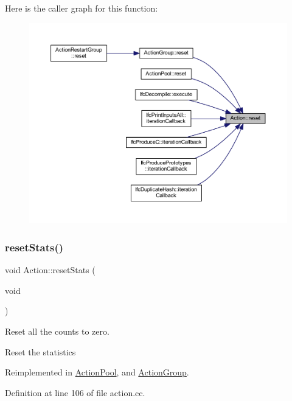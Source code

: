 Here is the caller graph for this function\+:
\nopagebreak
\begin{figure}[H]
\begin{center}
\leavevmode
\includegraphics[width=350pt]{class_action_ac7c1cf16bb63e0741ba16be5179cf943_icgraph}
\end{center}
\end{figure}
\mbox{\label{class_action_a8ac616ae7f497202746a92c95e32821d}} 
\subsubsection{\texorpdfstring{resetStats()}{resetStats()}}
{\footnotesize\ttfamily void Action\+::reset\+Stats (\begin{DoxyParamCaption}\item[{void}]{ }\end{DoxyParamCaption})\hspace{0.3cm}{\ttfamily [virtual]}}



Reset all the counts to zero. 

Reset the statistics 

Reimplemented in \mbox{\hyperlink{class_action_pool_aef3e6dfc90703230f5f4e3fcdc626984}{Action\+Pool}}, and \mbox{\hyperlink{class_action_group_a536ed9307295585894a5f083415f2f77}{Action\+Group}}.



Definition at line 106 of file action.\+cc.

